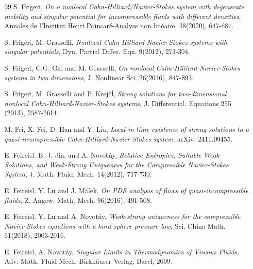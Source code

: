 \documentclass[reqno,a4paper,11pt]{amsart}
\theoremstyle{plain}
\numberwithin{equation}{section}
\begin{document}
\begin{thebibliography}{99}
	S. Frigeri, \textit{On a nonlocal Cahn-Hilliard/Navier-Stokes system with degenerate mobility and singular potential for incompressible fluids with
		different densities}, Annales de l'Institut Henri Poincar\'{e}-Analyse non lin\'{e}aire. 38(2020), 647-687.
	
	
	S. Frigeri, M. Grasselli, \textit{Nonlocal Cahn-Hilliard-Navier-Stokes systems with singular potentials}, Dyn. Partial Differ. Equ. 9(2012), 273-304.
	
	S. Frigeri, C.G. Gal and M. Grasselli, \textit{On nonlocal Cahn-Hilliard-Navier-Stokes systems in two dimensions},  J. Nonlinear Sci.
	26(2016), 847-893.
	
	S. Frigeri, M. Grasselli and P. Krej\v{c}\'{l}, \textit{Strong solutions for two-dimensional nonlocal Cahn-Hilliard-Navier-Stokes systems}, J. Differential. Equations 255 (2013), 2587-2614.
	
	
	
	
	
	
	
	 M. Fei, X. Fei, D. Han and Y. Liu, \textit{Local-in-time existence of strong solutions to a quasi-incompressible Cahn-Hilliard-Navier-Stokes system}, arXiv: 2411.09455.
	
	E. Feireisl, B. J. Jin, and A. Novot\'{n}y, \textit{Relative Entropies, Suitable Weak Solutions, and Weak-Strong Uniqueness
		for the Compressible Navier-Stokes System}, J. Math. Fluid. Mech. 14(2012), 717-730.
	
	E. Feireisl, Y. Lu and J. M\'alek, \textit{On PDE analysis of flows of quasi-incompressible fluids}, Z. Angew. Math. Mech. 96(2016), 491-508.
	
	E. Feireisl, Y. Lu and A. Novot\'{n}y, \textit{Weak-strong uniqueness for the compressible Navier-Stokes equations with a hard-sphere pressure law}, Sci. China Math. 61(2018), 2003-2016.
	
	E. Feireisl, A. Novot\'{n}y, \textit{Singular Limits in Thermodynamics of Viscous Fluids}, Adv. Math. Fluid Mech. Birkh\"{a}user Verlag, Basel, 2009.
	

\end{thebibliography}
\end{document}

